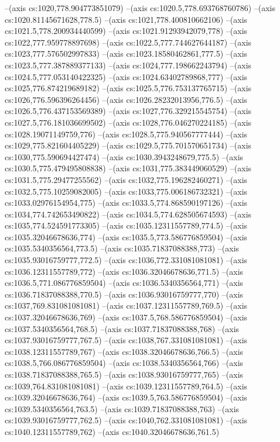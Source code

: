 --(axis cs:1020,778.904773851079)
--(axis cs:1020.5,778.693768760786)
--(axis cs:1020.81145671628,778.5)
--(axis cs:1021,778.400810662106)
--(axis cs:1021.5,778.200934440599)
--(axis cs:1021.91293942079,778)
--(axis cs:1022,777.959778897698)
--(axis cs:1022.5,777.744627644187)
--(axis cs:1023,777.576502997833)
--(axis cs:1023.18580462861,777.5)
--(axis cs:1023.5,777.387889377133)
--(axis cs:1024,777.198662243794)
--(axis cs:1024.5,777.053140422325)
--(axis cs:1024.63402789868,777)
--(axis cs:1025,776.874219689182)
--(axis cs:1025.5,776.753137765715)
--(axis cs:1026,776.596396264456)
--(axis cs:1026.28232013956,776.5)
--(axis cs:1026.5,776.437153569389)
--(axis cs:1027,776.329215545754)
--(axis cs:1027.5,776.181036699502)
--(axis cs:1028,776.046270224185)
--(axis cs:1028.19071149759,776)
--(axis cs:1028.5,775.940567777444)
--(axis cs:1029,775.821604405229)
--(axis cs:1029.5,775.701570651734)
--(axis cs:1030,775.590694427474)
--(axis cs:1030.3943248679,775.5)
--(axis cs:1030.5,775.479495808838)
--(axis cs:1031,775.383449060529)
--(axis cs:1031.5,775.29477255562)
--(axis cs:1032,775.196282460271)
--(axis cs:1032.5,775.10259082005)
--(axis cs:1033,775.006186732321)
--(axis cs:1033.02976154954,775)
--(axis cs:1033.5,774.868590197126)
--(axis cs:1034,774.742653490822)
--(axis cs:1034.5,774.628505674593)
--(axis cs:1035,774.524591773305)
--(axis cs:1035.12311557789,774.5)
--(axis cs:1035.32046678636,774)
--(axis cs:1035.5,773.586776859504)
--(axis cs:1035.5340356564,773.5)
--(axis cs:1035.71837088388,773)
--(axis cs:1035.93016759777,772.5)
--(axis cs:1036,772.331081081081)
--(axis cs:1036.12311557789,772)
--(axis cs:1036.32046678636,771.5)
--(axis cs:1036.5,771.086776859504)
--(axis cs:1036.5340356564,771)
--(axis cs:1036.71837088388,770.5)
--(axis cs:1036.93016759777,770)
--(axis cs:1037,769.831081081081)
--(axis cs:1037.12311557789,769.5)
--(axis cs:1037.32046678636,769)
--(axis cs:1037.5,768.586776859504)
--(axis cs:1037.5340356564,768.5)
--(axis cs:1037.71837088388,768)
--(axis cs:1037.93016759777,767.5)
--(axis cs:1038,767.331081081081)
--(axis cs:1038.12311557789,767)
--(axis cs:1038.32046678636,766.5)
--(axis cs:1038.5,766.086776859504)
--(axis cs:1038.5340356564,766)
--(axis cs:1038.71837088388,765.5)
--(axis cs:1038.93016759777,765)
--(axis cs:1039,764.831081081081)
--(axis cs:1039.12311557789,764.5)
--(axis cs:1039.32046678636,764)
--(axis cs:1039.5,763.586776859504)
--(axis cs:1039.5340356564,763.5)
--(axis cs:1039.71837088388,763)
--(axis cs:1039.93016759777,762.5)
--(axis cs:1040,762.331081081081)
--(axis cs:1040.12311557789,762)
--(axis cs:1040.32046678636,761.5)
